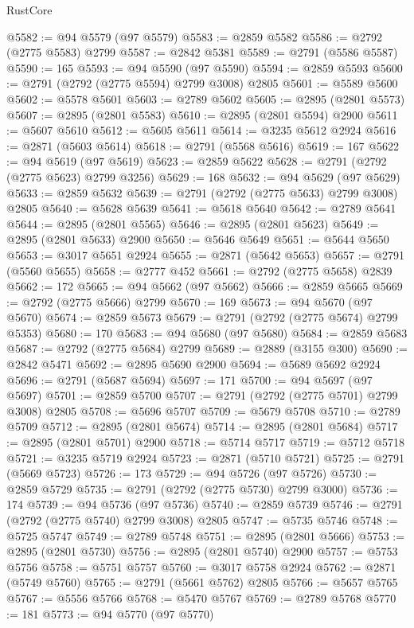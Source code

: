 \begin{lexlean}{RustCore}
\begin{coremodule}
@5582 := @94 @5579 (@97 @5579)
@5583 := @2859 @5582
@5586 := @2792 (@2775 @5583) @2799
@5587 := @2842 @5381
@5589 := @2791 (@5586 @5587)
@5590 := 165
@5593 := @94 @5590 (@97 @5590)
@5594 := @2859 @5593
@5600 := @2791 (@2792 (@2775 @5594) @2799 @3008) @2805
@5601 := @5589 @5600
@5602 := @5578 @5601
@5603 := @2789 @5602
@5605 := @2895 (@2801 @5573)
@5607 := @2895 (@2801 @5583)
@5610 := @2895 (@2801 @5594) @2900
@5611 := @5607 @5610
@5612 := @5605 @5611
@5614 := @3235 @5612 @2924
@5616 := @2871 (@5603 @5614)
@5618 := @2791 (@5568 @5616)
@5619 := 167
@5622 := @94 @5619 (@97 @5619)
@5623 := @2859 @5622
@5628 := @2791 (@2792 (@2775 @5623) @2799 @3256)
@5629 := 168
@5632 := @94 @5629 (@97 @5629)
@5633 := @2859 @5632
@5639 := @2791 (@2792 (@2775 @5633) @2799 @3008) @2805
@5640 := @5628 @5639
@5641 := @5618 @5640
@5642 := @2789 @5641
@5644 := @2895 (@2801 @5565)
@5646 := @2895 (@2801 @5623)
@5649 := @2895 (@2801 @5633) @2900
@5650 := @5646 @5649
@5651 := @5644 @5650
@5653 := @3017 @5651 @2924
@5655 := @2871 (@5642 @5653)
@5657 := @2791 (@5560 @5655)
@5658 := @2777 @452
@5661 := @2792 (@2775 @5658) @2839
@5662 := 172
@5665 := @94 @5662 (@97 @5662)
@5666 := @2859 @5665
@5669 := @2792 (@2775 @5666) @2799
@5670 := 169
@5673 := @94 @5670 (@97 @5670)
@5674 := @2859 @5673
@5679 := @2791 (@2792 (@2775 @5674) @2799 @5353)
@5680 := 170
@5683 := @94 @5680 (@97 @5680)
@5684 := @2859 @5683
@5687 := @2792 (@2775 @5684) @2799
@5689 := @2889 (@3155 @300)
@5690 := @2842 @5471
@5692 := @2895 @5690 @2900
@5694 := @5689 @5692 @2924
@5696 := @2791 (@5687 @5694)
@5697 := 171
@5700 := @94 @5697 (@97 @5697)
@5701 := @2859 @5700
@5707 := @2791 (@2792 (@2775 @5701) @2799 @3008) @2805
@5708 := @5696 @5707
@5709 := @5679 @5708
@5710 := @2789 @5709
@5712 := @2895 (@2801 @5674)
@5714 := @2895 (@2801 @5684)
@5717 := @2895 (@2801 @5701) @2900
@5718 := @5714 @5717
@5719 := @5712 @5718
@5721 := @3235 @5719 @2924
@5723 := @2871 (@5710 @5721)
@5725 := @2791 (@5669 @5723)
@5726 := 173
@5729 := @94 @5726 (@97 @5726)
@5730 := @2859 @5729
@5735 := @2791 (@2792 (@2775 @5730) @2799 @3000)
@5736 := 174
@5739 := @94 @5736 (@97 @5736)
@5740 := @2859 @5739
@5746 := @2791 (@2792 (@2775 @5740) @2799 @3008) @2805
@5747 := @5735 @5746
@5748 := @5725 @5747
@5749 := @2789 @5748
@5751 := @2895 (@2801 @5666)
@5753 := @2895 (@2801 @5730)
@5756 := @2895 (@2801 @5740) @2900
@5757 := @5753 @5756
@5758 := @5751 @5757
@5760 := @3017 @5758 @2924
@5762 := @2871 (@5749 @5760)
@5765 := @2791 (@5661 @5762) @2805
@5766 := @5657 @5765
@5767 := @5556 @5766
@5768 := @5470 @5767
@5769 := @2789 @5768
@5770 := 181
@5773 := @94 @5770 (@97 @5770)

\end{coremodule}
\end{lexlean}
